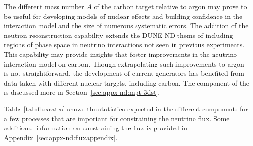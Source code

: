 The  
different mass number $A$ of the carbon target relative to argon may prove to be useful for developing models of nuclear effects and building confidence in the interaction model and the size of numerous systematic errors.  The addition of the neutron reconstruction capability extends the DUNE ND theme of including regions of phase space in neutrino interactions not seen in previous experiments.  This capability may provide insights that foster improvements in the neutrino interaction model on carbon.  Though extrapolating such improvements to argon is not straightforward, the development of current generators has benefited from data taken with different nuclear targets, including carbon. 
The  component of the  is discussed more in Section~\ref{sec:appx-nd:mpt-3dst}.

Table~\ref{tab:fluxrates} shows the statistics expected in the different  components for a few processes that are important for constraining the neutrino flux.  Some additional information on constraining the flux is provided in Appendix~\ref{sec:appx-nd:fluxappendix}.

